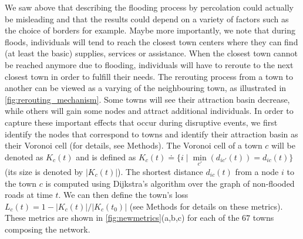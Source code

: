 \documentclass[twocolumn,fleqn,10pt]{wlscirep}
\begin{document}
We saw above that describing the flooding process by percolation could actually be misleading and that the results could depend on a variety of factors such as the choice of borders for example. Maybe more importantly, we note that during floods, individuals will tend to reach the closest town centers  where they can find (at least the basic) supplies, services or assistance. When the closest town cannot be reached anymore due to flooding, individuals will have to reroute to the next closest town in order to fulfill their needs. The rerouting process from a town to another can be viewed as a varying  of the neighbouring town, as illustrated in \cref{fig:rerouting_mechanism}. Some towns will see their attraction basin decrease, while others will gain some nodes and attract additional individuals. In order to capture these important effects that occur during disruptive events, we first identify the nodes that correspond to towns and identify their attraction basin as their Voronoi cell (for details, see Methods). The Voronoi cell of a town $c$ will be denoted as $K_c(t)$ and is defined as $K_c(t) \doteq \{ i \mid \min\limits_{c'} (d_{i c'} (t)) = d_{ic} (t) \}$ (its size is denoted by $|K_c(t)|$). The shortest distance $d_{ic}(t)$ from a node $i$ to the town $c$ is computed using Dijkstra's 
algorithm over the graph of non-flooded roads at time $t$. We can then define the town's loss $L_c(t)=1-|K_c(t)|/|K_c(t_0)|$ (see Methods for details on these metrics). These metrics are shown in \cref{fig:newmetrics}(a,b,c) for each of the $67$ towns composing the network. 
\end{document}
